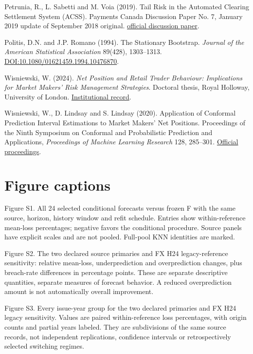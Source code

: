 \documentclass[11pt,a4paper]{article}
\begin{document}
Petrunia, R., L. Sabetti and M. Voia (2019). Tail Risk in the Automated Clearing Settlement System (ACSS). Payments Canada Discussion Paper No. 7, January 2019 update of September 2018 original. \href{https://www.paiements.ca/sites/default/files/tail_risk_in_the_automated_clearing_settlement_system_acss.pdf}{official discussion paper}.

Politis, D.N. and J.P. Romano (1994). The Stationary Bootstrap. \emph{Journal of the American Statistical Association} 89(428), 1303--1313. \href{https://doi.org/10.1080/01621459.1994.10476870}{DOI:10.1080/01621459.1994.10476870}.

Wisniewski, W. (2024). \emph{Net Position and Retail Trader Behaviour: Implications for Market Makers' Risk Management Strategies}. Doctoral thesis, Royal Holloway, University of London. \href{https://pure.royalholloway.ac.uk/en/publications/net-position-and-retail-trader-behaviour-implications-for-market-/}{Institutional record}.

Wisniewski, W., D. Lindsay and S. Lindsay (2020). Application of Conformal Prediction Interval Estimations to Market Makers' Net Positions. Proceedings of the Ninth Symposium on Conformal and Probabilistic Prediction and Applications, \emph{Proceedings of Machine Learning Research} 128, 285--301. \href{https://proceedings.mlr.press/v128/wisniewski20a.html}{Official proceedings}.

\section*{Figure captions}
Figure S1. All 24 selected conditional forecasts versus frozen F with the same source, horizon, history window and refit schedule. Entries show within-reference mean-loss percentages; negative favors the conditional procedure. Source panels have explicit scales and are not pooled. Full-pool KNN identities are marked.

Figure S2. The two declared source primaries and FX H24 legacy-reference sensitivity: relative mean-loss, underprediction and overprediction changes, plus breach-rate differences in percentage points. These are separate descriptive quantities, separate measures of forecast behavior. A reduced overprediction amount is not automatically overall improvement.

Figure S3. Every issue-year group for the two declared primaries and FX H24 legacy sensitivity. Values are paired within-reference loss percentages, with origin counts and partial years labeled. They are subdivisions of the same source records, not independent replications, confidence intervals or retrospectively selected switching regimes.
\end{document}
